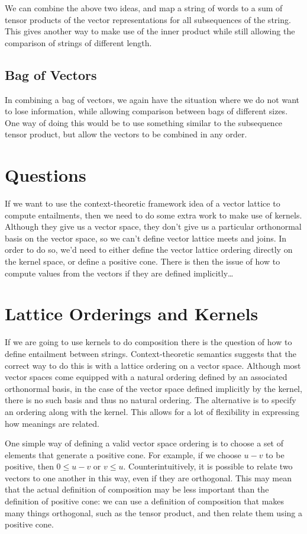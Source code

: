 \documentclass{article}
\begin{document}
We can combine the above two ideas, and map a string of words to a sum
of tensor products of the vector representations for all subsequences
of the string. This gives another way to make use of the inner product
while still allowing the comparison of strings of different length.

\subsection*{Bag of Vectors}

In combining a bag of vectors, we again have the situation where we
do not want to lose information, while allowing comparison between
bags of different sizes. One way of doing this would be to use
something similar to the subsequence tensor product, but allow the
vectors to be combined in any order.

\section{Questions}

If we want to use the context-theoretic framework idea of a vector
lattice to compute entailments, then we need to do some extra work to
make use of kernels. Although they give us a vector space, they don't
give us a particular orthonormal basis on the vector space, so we
can't define vector lattice meets and joins. In order to do so, we'd
need to either define the vector lattice ordering directly on the
kernel space, or define a positive cone. There is then the issue of
how to compute values from the vectors if they are defined
implicitly\ldots

\section{Lattice Orderings and Kernels}

If we are going to use kernels to do composition there is the question
of how to define entailment between strings. Context-theoretic
semantics suggests that the correct way to do this is with a lattice
ordering on a vector space. Although most vector spaces come equipped
with a natural ordering defined by an associated orthonormal basis, in
the case of the vector space defined implicitly by the kernel, there
is no such basis and thus no natural ordering. The alternative is to
specify an ordering along with the kernel. This allows for a lot of
flexibility in expressing how meanings are related.

One simple way of defining a valid vector space ordering is to choose
a set of elements that generate a positive cone. For example, if we
choose $u - v$ to be positive, then $0 \le u - v$ or $v \le
u$. Counterintuitively, it is possible to relate two vectors to one
another in this way, even if they are orthogonal. This may mean that
the actual definition of composition may be less important than the
definition of positive cone: we can use a definition of composition
that makes many things orthogonal, such as the tensor product, and
then relate them using a positive cone.
\end{document}
